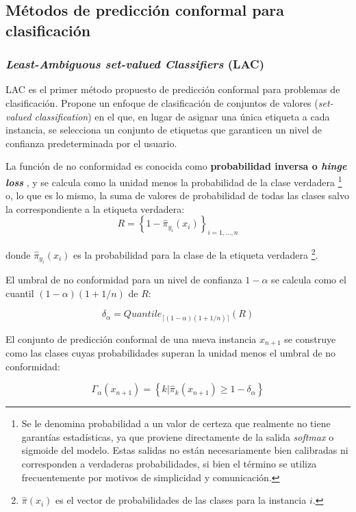 \subsection{Métodos de predicción conformal para clasificación}

\subsubsection{\textit{Least-Ambiguous set-valued Classifiers} (LAC)}

LAC \cite{sadinle2019} es el primer método propuesto de predicción conformal para problemas de clasificación. 
Propone un enfoque de clasificación de conjuntos de valores (\textit{set-valued classification}) en el que, 
en lugar de asignar una única etiqueta a cada instancia, se selecciona un conjunto de etiquetas que 
garanticen un nivel de confianza predeterminada por el usuario.

La función de no conformidad es conocida como \textbf{probabilidad inversa o \textit{hinge loss}} 
\cite{johansson2017}, y se calcula como la unidad menos la probabilidad de la clase verdadera%
\footnote{
    Se le denomina probabilidad a un valor de certeza que realmente no tiene garantías estadísticas,
    ya que proviene directamente de la salida \textit{softmax} o sigmoide del modelo. Estas salidas no 
    están necesariamente bien calibradas ni corresponden a verdaderas probabilidades, si bien el término 
    se utiliza frecuentemente por motivos de simplicidad y comunicación.
}
o, lo que es lo mismo, la suma de valores de probabilidad de todas las clases salvo
la correspondiente a la etiqueta verdadera:
$$
R = \left\{ 1 - \hat{\pi}_{y_i}(x_i) \right\}_{i=1,...,n}
$$

donde $\hat{\pi}_{y_i}(x_i)$ es la probabilidad para la clase de la etiqueta verdadera%
\footnote{
    $\hat{\pi}(x_i)$ es el vector de probabilidades de las clases para la instancia $i$.
}.


El umbral de no conformidad para un nivel de confianza $1-\alpha$ se calcula como el cuantil 
$(1-\alpha)(1+1/n)$ de $R$:

$$
\delta_\alpha = Quantile_{ \lceil  (1-\alpha) (1 + 1/n)  \rceil } ( R )
$$

El conjunto de predicción conformal de una nueva instancia $x_{n+1}$ se construye como las clases cuyas 
probabilidades superan la unidad menos el umbral de no conformidad:

$$
\Gamma_\alpha(x_{n+1}) = \left\{ k | \hat{\pi}_k(x_{n+1}) \ge 1-\delta_\alpha \right\} 
$$


